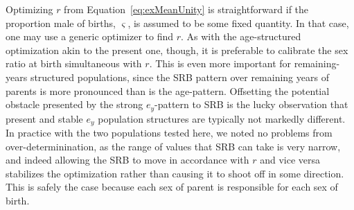 
Optimizing $r$ from Equation~\eqref{eq:exMeanUnity} is straightforward if the
proportion male of births, $\varsigma$, is assumed to be some fixed quantity.
In that case, one may use a generic optimizer to find $r$. As with the
age-structured optimization akin to the present one, though, it is preferable to
calibrate the sex ratio at birth simultaneous with $r$. This is even more
important for remaining-years structured populations, since the SRB pattern over
remaining years of parents is more pronounced than is the age-pattern.
Offsetting the potential obstacle presented by the strong $e_y$-pattern to SRB
is the lucky observation that present and stable $e_y$ population structures are
typically not markedly different. In practice with the two populations tested
here, we noted no problems from over-determinination, as the range of values
that SRB can take is very narrow, and indeed allowing the SRB to move in accordance
with $r$ and vice versa stabilizes the optimization rather than causing it to
shoot off in some direction. This is safely the case because each sex of parent
is responsible for each sex of birth.


